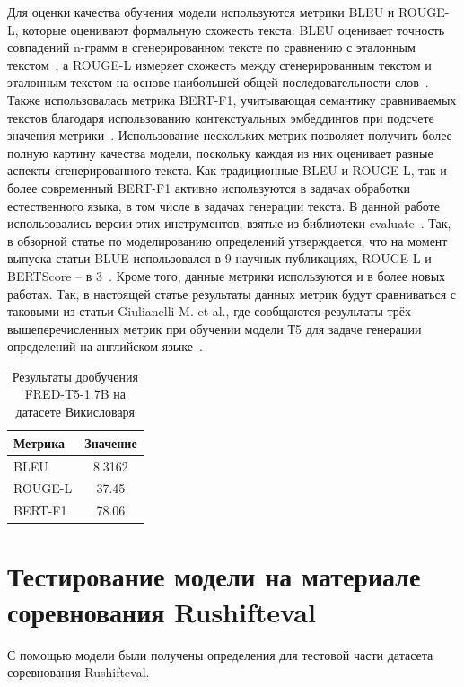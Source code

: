 \documentclass[LI,VKR]{HSEUniversity}
\begin{document}
Для оценки качества обучения модели используются метрики BLEU и ROUGE-L,
которые оценивают формальную схожесть текста: BLEU оценивает точность совпадений n-грамм
в сгенерированном тексте по сравнению с эталонным текстом~\cite{BLUE}, а ROUGE-L измеряет схожесть между
сгенерированным текстом и эталонным текстом на основе наибольшей общей последовательности слов~\cite{ROUGE}.
Также использовалась метрика BERT-F1, учитывающая семантику сравниваемых текстов благодаря
использованию контекстуальных эмбеддингов при подсчете значения метрики~\cite{BERTScore}.
Использование нескольких метрик позволяет получить более полную картину качества модели,
поскольку каждая из них оценивает разные аспекты сгенерированного текста.
Как традиционные BLEU и ROUGE-L, так и более современный BERT-F1 активно используются в
задачах обработки естественного языка, в том числе в задачах генерации текста.
В данной работе использовались версии этих инструментов, взятые из библиотеки evaluate~\cite{Evaluate}.
Так, в обзорной статье по моделированию определений утверждается, что на момент выпуска статьи BLUE
использовался в 9 научных публикациях, ROUGE-L и BERTScore – в 3~\cite{DefinitionModelingReviewAndDatasetAnalysis}.
Кроме того, данные метрики используются и в более новых работах.
Так, в настоящей статье результаты данных метрик будут сравниваться с таковыми из статьи
Giulianelli M. et al., где сообщаются результаты трёх вышеперечисленных метрик при обучении модели
Т5 для задаче генерации определений на английском языке~\cite{DefinitionGenerationMainArticle}.

\begin{table}[H]
\centering
\caption{Результаты дообучения FRED-T5-1.7B на датасете Викисловаря}
\begin{tabular}{lc}
\hline
Метрика                  & Значение \\
\hline
BLEU            & 8.3162                  \\
ROUGE-L           & 37.45                  \\
BERT-F1          & 78.06                  \\
\hline
\end{tabular}
\end{table}

\section{Тестирование модели на материале соревнования Rushifteval}

С помощью модели были получены определения для тестовой части датасета соревнования Rushifteval.
\end{document}
